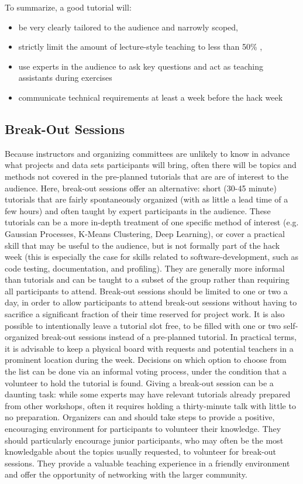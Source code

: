 \documentclass{nature}
\begin{document}
To summarize, a good tutorial will:
\begin{itemize}
\item be very clearly tailored to the audience and narrowly scoped,
\item strictly limit the amount of lecture-style teaching to less than 50\% ,
\item use experts in the audience to ask key questions and act as teaching assistants during exercises
\item communicate technical requirements at least a week before the hack week
\end{itemize}

\subsection{Break-Out Sessions}

Because instructors and organizing committees are unlikely to know in advance what projects and data sets participants will bring, often there will be topics and methods not covered in the pre-planned tutorials that are are of interest to the audience. Here, break-out sessions offer an alternative: short (30-45 minute) tutorials that are fairly spontaneously organized (with as little a lead time of a few hours) and often taught by expert participants in the audience. These tutorials can be a more in-depth treatment of one specific method of interest (e.g. Gaussian Processes, K-Means Clustering, Deep Learning), or cover a practical skill that may be useful to the audience, but is not formally part of the hack week (this is especially the case for skills related to software-development, such as code testing, documentation, and profiling). They are generally more informal than tutorials and can be taught to a subset of the group rather than requiring all participants to attend.
Break-out sessions should be limited to one or two a day, in order to allow participants to attend break-out sessions without having to sacrifice a significant fraction of their time reserved for project work. It is also possible to intentionally leave a tutorial slot free, to be filled with one or two self-organized break-out sessions instead of a pre-planned tutorial. In practical terms, it is advisable to keep a physical board with requests and potential teachers in a prominent location during the week. Decisions on which option to choose from the list can be done via an informal voting process, under the condition that a volunteer to hold the tutorial is found. Giving a break-out session can be a daunting task: while some experts may have relevant tutorials already prepared from other workshops, often it requires holding a thirty-minute talk with little to no preparation. Organizers can and should take steps to provide a positive, encouraging environment for participants to volunteer their knowledge. They should particularly encourage junior participants, who may often be the most knowledgable about the topics usually requested, to volunteer for break-out sessions. They provide a valuable teaching experience in a friendly environment and offer the opportunity of networking with the larger community.
\end{document}

